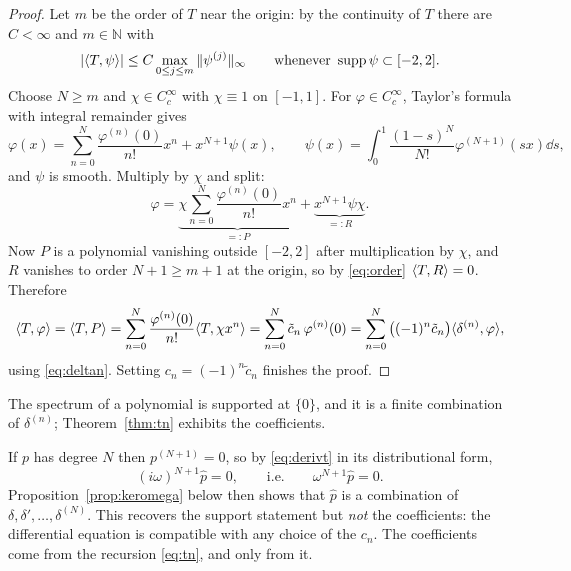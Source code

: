 \begin{proof}
Let $m$ be the order of $T$ near the origin: by the continuity of $T$ there are $C<\infty$ and
$m\in\mathbb{N}$ with
\begin{equation}
|\langle T,\psi\rangle|\le C\max_{0\le j\le m}\|\psi^{(j)}\|_{\infty}
\qquad\text{whenever }\operatorname{supp}\psi\subset[-2,2].
\label{eq:order}
\end{equation}
Choose $N\ge m$ and $\chi\in C_{c}^{\infty}$ with $\chi\equiv1$ on $[-1,1]$. For
$\varphi\in C_{c}^{\infty}$, Taylor's formula with integral remainder gives
\begin{equation}
\varphi(x)=\sum_{n=0}^{N}\frac{\varphi^{(n)}(0)}{n!}x^{n}+x^{N+1}\psi(x),
\qquad
\psi(x)=\int_{0}^{1}\frac{(1-s)^{N}}{N!}\varphi^{(N+1)}(sx)\dd s ,
\end{equation}
and $\psi$ is smooth. Multiply by $\chi$ and split:
\begin{equation}
\varphi=\underbrace{\chi\sum_{n=0}^{N}\frac{\varphi^{(n)}(0)}{n!}x^{n}}_{=:P}
+\underbrace{x^{N+1}\psi\chi}_{=:R}.
\end{equation}
Now $P$ is a polynomial vanishing outside $[-2,2]$ after multiplication by $\chi$, and $R$ vanishes
to order $N+1\ge m+1$ at the origin, so by \eqref{eq:order} $\langle T,R\rangle=0$. Therefore
\begin{equation}
\langle T,\varphi\rangle=\langle T,P\rangle
=\sum_{n=0}^{N}\frac{\varphi^{(n)}(0)}{n!}\langle T,\chi x^{n}\rangle
=\sum_{n=0}^{N}\tilde c_{n}\,\varphi^{(n)}(0)
=\sum_{n=0}^{N}\big((-1)^{n}\tilde c_{n}\big)\langle \delta^{(n)},\varphi\rangle,
\end{equation}
using \eqref{eq:deltan}. Setting $c_{n}=(-1)^{n}\tilde c_{n}$ finishes the proof.
\end{proof}

\begin{corollary}\label{cor:support-poly}
The spectrum of a polynomial is supported at $\{0\}$, and it is a finite combination of
$\delta^{(n)}$; Theorem~\ref{thm:tn} exhibits the coefficients.
\end{corollary}

\begin{remark}
If $p$ has degree $N$ then $p^{(N+1)}=0$, so by \eqref{eq:derivt} in its distributional form,
\begin{equation}
(i\omega)^{N+1}\widehat p=0 ,
\qquad\text{i.e.}\qquad
\omega^{N+1}\widehat p=0 .
\end{equation}
Proposition~\ref{prop:keromega} below then shows that $\widehat p$ is a combination of
$\delta,\delta',\dots,\delta^{(N)}$. This recovers the support statement but \emph{not} the
coefficients: the differential equation is compatible with any choice of the $c_{n}$. The
coefficients come from the recursion \eqref{eq:tn}, and only from it.
\end{remark}

